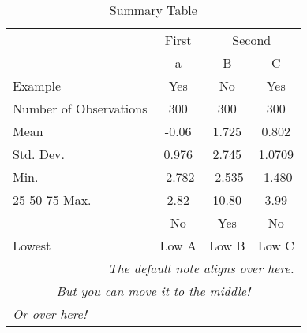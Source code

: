 \begin{table}[!ht]
  \centering
  \caption{Summary Table}
  \label{table:summarytable}
\begin{tabular}{lccc}
  \toprule
  \toprule
  & \multicolumn{1}{c}{First} & \multicolumn{2}{c}{Second} \\
  \cmidrule(lr){2-2}\cmidrule(lr){3-4}
   &   a & B & C\\
  Example & Yes & No & Yes\\
  \midrule
  Number of Observations & 300 & 300 & 300 \\
  Mean & -0.06 & 1.725 & 0.802 \\
  Std. Dev. & 0.976 & 2.745 & 1.0709 \\
  Min. & -2.782 & -2.535 & -1.480 \\
  25%
  50%
  75%
  Max. & 2.82 & 10.80 & 3.99 \\
   & No & Yes & No\\
  \bottomrule
  Lowest & Low A & Low B & Low C\\
  \bottomrule
  \multicolumn{4}{r}{{\small \textit{The default note aligns over here.}}}\\
  \multicolumn{4}{c}{{\small \textit{But you can move it to the middle!}}}\\
  \multicolumn{4}{l}{{\small \textit{Or over here!}}}\\
\end{tabular}
\end{table}
